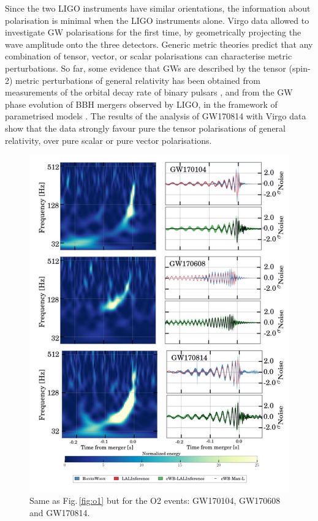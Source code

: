\documentclass[binding=0.6cm, LaM]{sapthesis}
\begin{document}
	Since the two LIGO instruments have similar orientations, 
	the information about polarisation is minimal when the LIGO instruments alone.
	Virgo data allowed to investigate GW polarisations for the first time, by geometrically 
	projecting the wave amplitude onto the three detectors.
	Generic metric theories predict that any combination of tensor, vector, or scalar 
	polarisations \cite{85} can characterise metric perturbations.
	So far, some evidence that GWs are described by the tensor (spin-2) metric perturbations 
	of general relativity has been obtained from measurements of the orbital decay rate of binary pulsars \cite{135,140}, 
	and from the GW phase evolution of BBH mergers observed by LIGO, in the framework of parametrised models \cite{14,52,60}. 
	The results of the analysis of GW170814 with Virgo data show that the data strongly favour
	pure the tensor polarisations of general relativity, over pure scalar or pure vector polarisations.

        \begin{figure}[!t]
          \label{o2}
          \includegraphics[scale=0.45]{o2}
          \centering
          \caption{Same as Fig.\,\ref{fig:o1} but for the O2 events: GW170104, GW170608 and GW170814.}
          \label{fig:o2}
        \end{figure}
\end{document}
